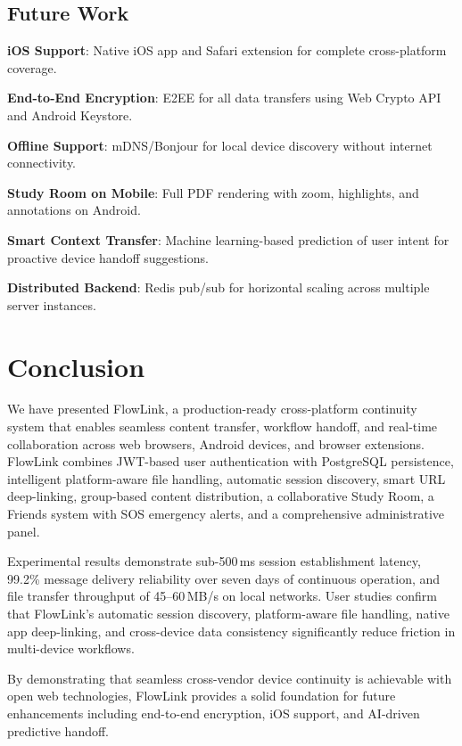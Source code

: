 \documentclass[conference]{IEEEtran}
\begin{document}
\subsection{Future Work}

\textbf{iOS Support}: Native iOS app and Safari extension for complete cross-platform coverage.

\textbf{End-to-End Encryption}: E2EE for all data transfers using Web Crypto API and Android Keystore.

\textbf{Offline Support}: mDNS/Bonjour for local device discovery without internet connectivity.

\textbf{Study Room on Mobile}: Full PDF rendering with zoom, highlights, and annotations on Android.

\textbf{Smart Context Transfer}: Machine learning-based prediction of user intent for proactive device handoff suggestions.

\textbf{Distributed Backend}: Redis pub/sub for horizontal scaling across multiple server instances.

\section{Conclusion}

We have presented FlowLink, a production-ready cross-platform continuity system that enables seamless content transfer, workflow handoff, and real-time collaboration across web browsers, Android devices, and browser extensions. FlowLink combines JWT-based user authentication with PostgreSQL persistence, intelligent platform-aware file handling, automatic session discovery, smart URL deep-linking, group-based content distribution, a collaborative Study Room, a Friends system with SOS emergency alerts, and a comprehensive administrative panel.

Experimental results demonstrate sub-500\,ms session establishment latency, 99.2\% message delivery reliability over seven days of continuous operation, and file transfer throughput of 45--60\,MB/s on local networks. User studies confirm that FlowLink's automatic session discovery, platform-aware file handling, native app deep-linking, and cross-device data consistency significantly reduce friction in multi-device workflows.

By demonstrating that seamless cross-vendor device continuity is achievable with open web technologies, FlowLink provides a solid foundation for future enhancements including end-to-end encryption, iOS support, and AI-driven predictive handoff.
\end{document}
